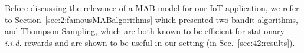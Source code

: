 



Before discussing the relevance of a MAB model for our IoT application, we refer to Section~\ref{sec:2:famousMABalgorithms} which presented two bandit algorithms, \UCB{} and Thompson Sampling,
which are both known to be efficient for stationary \emph{i.i.d.} rewards and are shown to be useful in our setting (in Sec.~\ref{sec:42:results}).





